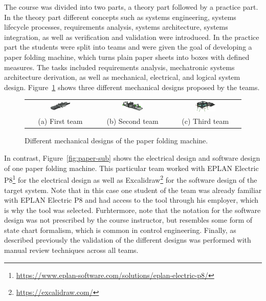 \documentclass{PDS}
\begin{document}
The course was divided into two parts, a theory part followed by a practice part.
In the theory part different concepts such as systems engineering, systems lifecycle processes, requirements analysis, systems architecture, systems integration, as well as verification and validation were introduced.
In the practice part the students were split into teams and were given the goal of developing a paper folding machine, which turns plain paper sheets into boxes with defined measures.
The tasks included requirements analysis, mechatronic systems architecture derivation, as well as mechanical, electrical, and logical system design.
Figure~\ref{fig:paper} shows three different mechanical designs proposed by the teams.

\begin{figure}[htbp]
    \begin{center}
        \begin{tabular}{ccc}
            \includegraphics[width=0.305\textwidth]{./figures/paper_1.png} &
            \includegraphics[width=0.305\textwidth]{./figures/paper_2.png} &
            \includegraphics[width=0.305\textwidth]{./figures/paper_3.png} \\
            (a) First team &
            (b) Second team &
            (c) Third team
        \end{tabular}
    \end{center}
    \caption{Different mechanical designs of the paper folding machine.}
    \label{fig:paper}
\end{figure}

In contrast, Figure~\ref{fig:paper-sub} shows the electrical design and software design of one paper folding machine.
This particular team worked with EPLAN Electric P8\footnote{\url{https://www.eplan-software.com/solutions/eplan-electric-p8/}} for the electrical design as well as Excalidraw\footnote{\url{https://excalidraw.com/}} for the software design of the target system.
Note that in this case one student of the team was already familiar with EPLAN Electric P8 and had access to the tool through his employer, which is why the tool was selected.
Furhtermore, note that the notation for the software design was not prescribed by the course instructor, but resembles some form of state chart formalism, which is common in control engineering.
Finally, as described previously the validation of the different designs was performed with manual review techniques across all teams.
\end{document}
